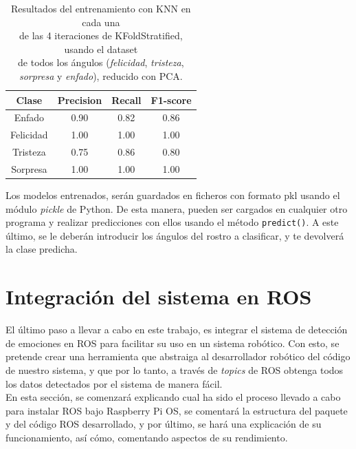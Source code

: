 \begin{table}
\begin{minipage}{0.48\linewidth}
\begin{adjustbox}{max width=\textwidth}
\begin{tabular}{|c|c|c|c|}
\hline
\textbf{Clase} & \textbf{Precision} & \textbf{Recall} & \textbf{F1-score}\\
\hline
     Enfado & 0.90 & 0.82 & 0.86\\
     Felicidad & 1.00 & 1.00 & 1.00\\
     Tristeza & 0.75 & 0.86 & 0.80\\
     Sorpresa & 1.00 & 1.00 & 1.00\\
\hline
\end{tabular}
\end{adjustbox}
\end{minipage}
\captionsetup{justification=centering}
\caption{Resultados del entrenamiento con KNN en cada una\\
de las 4 iteraciones de KFoldStratified, usando el dataset\\
de todos los ángulos (\textit{felicidad}, \textit{tristeza}, \\
\textit{sorpresa} y \textit{enfado}), reducido con PCA.}
\label{cuadro:resultados_KNN}
\end{table}

Los modelos entrenados, serán guardados en ficheros con formato pkl usando el módulo \textit{pickle} de Python. De esta manera, pueden ser cargados en cualquier otro programa y realizar predicciones con ellos usando el método \verb|predict()|. A este último, se le deberán introducir los ángulos del rostro a clasificar, y te devolverá la clase predicha.

\section{Integración del sistema en ROS}
\label{sec:integración_en_ros}

El último paso a llevar a cabo en este trabajo, es integrar el sistema de detección de emociones en ROS para facilitar su uso en un sistema robótico. Con esto, se pretende crear una herramienta que abstraiga al desarrollador robótico del código de nuestro sistema, y que por lo tanto, a través de \textit{topics} de ROS obtenga todos los datos detectados por el sistema de manera fácil.\\

En esta sección, se comenzará explicando cual ha sido el proceso llevado a cabo para instalar ROS bajo Raspberry Pi OS, se comentará la estructura del paquete y del código ROS desarrollado, y por último, se hará una explicación de su funcionamiento, así cómo, comentando aspectos de su rendimiento.

